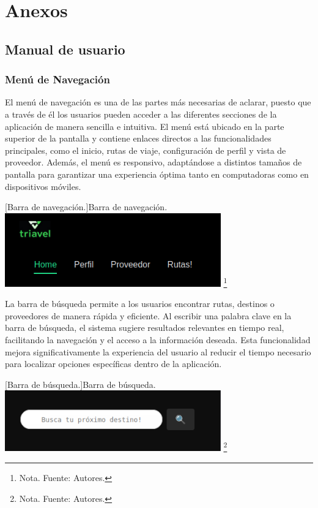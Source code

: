 \section{Anexos}

\subsection{Manual de usuario}
\label{manual-usuario}
\subsubsection{Menú de Navegación}

El menú de navegación es una de las partes más necesarias de aclarar, puesto que a través de él los usuarios pueden acceder a las diferentes secciones de la aplicación de manera sencilla e intuitiva. El menú está ubicado en la parte superior de la pantalla y contiene enlaces directos a las funcionalidades principales, como el inicio, rutas de viaje, configuración de perfil y vista de proveedor. Además, el menú es responsivo, adaptándose a distintos tamaños de pantalla para garantizar una experiencia óptima tanto en computadoras como en dispositivos móviles.

\vspace{2mm}
\begin{minipage}{0.9\textwidth}
\centering
{}[{Barra de navegación.}]{Barra de navegación.}
\label{ManualBarraNavegacion}
\includegraphics[width=0.7\textwidth]{Content/Images/ManualBarraNavegacion.png}
\footnote{Nota. \textup{Fuente: Autores.}}
\end{minipage}

La barra de búsqueda permite a los usuarios encontrar rutas, destinos o proveedores de manera rápida y eficiente. Al escribir una palabra clave en la barra de búsqueda, el sistema sugiere resultados relevantes en tiempo real, facilitando la navegación y el acceso a la información deseada. Esta funcionalidad mejora significativamente la experiencia del usuario al reducir el tiempo necesario para localizar opciones específicas dentro de la aplicación.

\vspace{2mm}
\begin{minipage}{0.9\textwidth}
\centering
{}[{Barra de búsqueda.}]{Barra de búsqueda.}
\label{ManualBarraBusqueda}
\includegraphics[width=0.7\textwidth]{Content/Images/ManualBarraBusqueda.png}
\footnote{Nota. \textup{Fuente: Autores.}}
\end{minipage}

